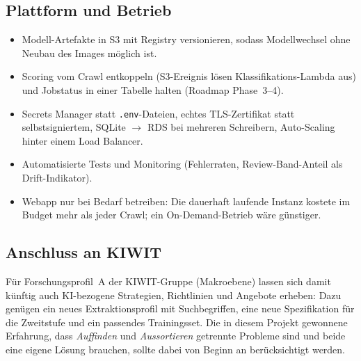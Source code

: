 \subsection{Plattform und Betrieb}
\begin{itemize}
  \item Modell-Artefakte in S3 mit Registry versionieren, sodass Modellwechsel ohne Neubau des Images möglich ist.
  \item Scoring vom Crawl entkoppeln (S3-Ereignis lösen Klassifikations-Lambda aus) und Jobstatus in einer Tabelle halten (Roadmap Phase~3--4).
  \item Secrets Manager statt \texttt{.env}-Dateien, echtes TLS-Zertifikat statt selbstsigniertem, SQLite $\to$ RDS bei mehreren Schreibern, Auto-Scaling hinter einem Load Balancer.
  \item Automatisierte Tests und Monitoring (Fehlerraten, Review-Band-Anteil als Drift-Indikator).
  \item Webapp nur bei Bedarf betreiben: Die dauerhaft laufende Instanz kostete im Budget mehr als jeder Crawl; ein On-Demand-Betrieb wäre günstiger.
\end{itemize}

\subsection{Anschluss an KIWIT}
Für Forschungsprofil~A der KIWIT-Gruppe (Makroebene) lassen sich damit künftig auch KI-bezogene Strategien, Richtlinien und Angebote erheben: Dazu genügen ein neues Extraktionsprofil mit Suchbegriffen, eine neue Spezifikation für die Zweitstufe und ein passendes Trainingsset. Die in diesem Projekt gewonnene Erfahrung, dass \emph{Auffinden} und \emph{Aussortieren} getrennte Probleme sind und beide eine eigene Lösung brauchen, sollte dabei von Beginn an berücksichtigt werden.
